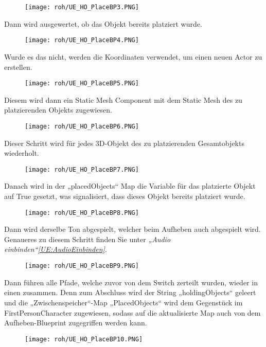 \begin{figure}[H]
    \centering
    \texttt{[image: roh/UE\_HO\_PlaceBP3.PNG]}
    \label{UE:HO_PlaceBP2_3_2}
\end{figure}
Dann wird ausgewertet, ob das Objekt bereits platziert wurde.
\begin{figure}[H]
    \centering
    \texttt{[image: roh/UE\_HO\_PlaceBP4.PNG]}
    \label{UE:HO_PlaceBP4}
\end{figure}
Wurde es das nicht, werden die Koordinaten verwendet, um einen neuen Actor zu erstellen.
\begin{figure}[H]
    \centering
    \texttt{[image: roh/UE\_HO\_PlaceBP5.PNG]}
    \label{UE:HO_PlaceBP5}
\end{figure}
Diesem wird dann ein Static Mesh Component mit dem Static Mesh des zu platzierenden Objekts zugewiesen.
\begin{figure}[H]
    \centering
    \texttt{[image: roh/UE\_HO\_PlaceBP6.PNG]}
    \label{UE:HO_PlaceBP6}
\end{figure}
Dieser Schritt wird für jedes 3D-Objekt des zu platzierenden Gesamtobjekts wiederholt.
\begin{figure}[H]
    \centering
    \texttt{[image: roh/UE\_HO\_PlaceBP7.PNG]}
    \label{UE:HO_PlaceBP7}
\end{figure}
Danach wird in der „placedObjects“ Map die Variable für das platzierte Objekt auf True gesetzt, was signalisiert, dass dieses Objekt bereits platziert wurde.
\begin{figure}[H]
    \centering
    \texttt{[image: roh/UE\_HO\_PlaceBP8.PNG]}
    \label{UE:HO_PlaceBP8}
\end{figure}
Dann wird derselbe Ton abgespielt, welcher beim Aufheben auch abgespielt wird. Genaueres zu diesem Schritt finden Sie unter \textit{„Audio einbinden“\ref{UE:AudioEinbinden}}.
\begin{figure}[H]
    \centering
    \texttt{[image: roh/UE\_HO\_PlaceBP9.PNG]}
    \label{UE:HO_PlaceBP9}
\end{figure}
Dann führen alle Pfade, welche zuvor von dem Switch zerteilt wurden, wieder in einen zusammen. Denn zum Abschluss wird der String „holdingObjects“ geleert und die „Zwischenspeicher“-Map „PlacedObjects“ wird dem Gegenstück im FirstPersonCharacter zugewiesen, sodass auf die aktualisierte Map auch von dem Aufheben-Blueprint zugegriffen werden kann.
\begin{figure}[H]
    \centering
    \texttt{[image: roh/UE\_HO\_PlaceBP10.PNG]}
    \label{UE:HO_PlaceBP10}
\end{figure}

